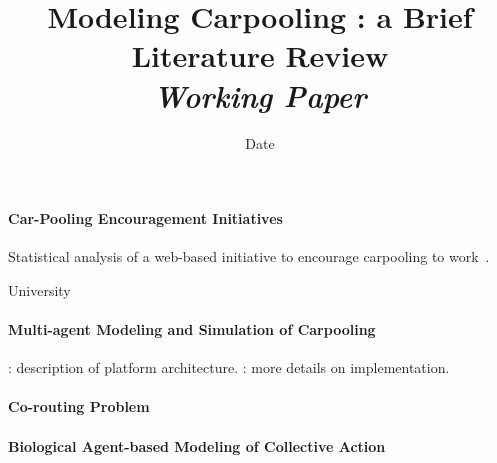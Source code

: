 


\title{Modeling Carpooling : a Brief Literature Review\bigskip\\
\textit{Working Paper}
}

\author{}
\date{Date}


\maketitle

\justify


\begin{abstract}

\end{abstract}



\paragraph{Car-Pooling Encouragement Initiatives}

Statistical analysis of a web-based initiative to encourage carpooling to work~\cite{Abrahamse201245}.

University



\paragraph{Multi-agent Modeling and Simulation of Carpooling}

\textbf{}
\cite{Galland2013860} : description of platform architecture.
\cite{galland2014multi} : more details on implementation.




\paragraph{Co-routing Problem}



\paragraph{Biological Agent-based Modeling of Collective Action}

